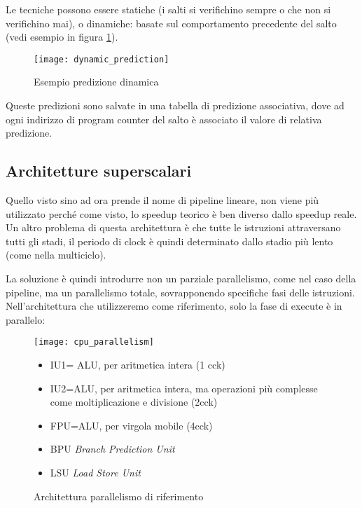 \documentclass[../template]{subfiles}
\begin{document}
Le tecniche possono essere statiche (i salti si verifichino sempre o che non si verifichino mai), o dinamiche: basate
sul comportamento precedente del salto (vedi esempio in figura \ref{fig:dynamic_prediction}).

\begin{figure}[h]
    \centering
    \texttt{[image: dynamic\_prediction]}
    \caption{Esempio predizione dinamica}
    \label{fig:dynamic_prediction}
\end{figure}

Queste predizioni sono salvate in una tabella di predizione associativa, dove ad ogni indirizzo di program counter del
salto è associato il valore di relativa predizione.

\subsection{Architetture superscalari}
Quello visto sino ad ora prende il nome di pipeline lineare, non viene più utilizzato perché come visto, lo speedup
teorico è ben diverso dallo speedup reale.
Un altro problema di questa architettura è che tutte le istruzioni attraversano tutti gli stadi, il periodo di clock è
quindi determinato dallo stadio più lento (come nella multiciclo).

La soluzione è quindi introdurre non un parziale parallelismo, come nel caso della pipeline, ma un parallelismo totale,
sovrapponendo specifiche fasi delle istruzioni.
Nell'architettura che utilizzeremo come riferimento, solo la fase di execute è in parallelo:

\begin{figure}[h]
    \begin{minipage}{.5\textwidth}
        \centering
        \texttt{[image: cpu\_parallelism]}
    \end{minipage}
    \begin{minipage}{.45\textwidth}
        \begin{itemize}
            \item IU1= ALU, per aritmetica intera (1 cck)
            \item IU2=ALU, per aritmetica intera, ma operazioni più complesse come moltiplicazione e divisione (2cck)
            \item FPU=ALU, per virgola mobile (4cck)
            \item BPU \textit{Branch Prediction Unit}
            \item LSU \textit{Load Store Unit}
        \end{itemize}
    \end{minipage}
    \caption{Architettura parallelismo di riferimento}
\end{figure}
\end{document}
